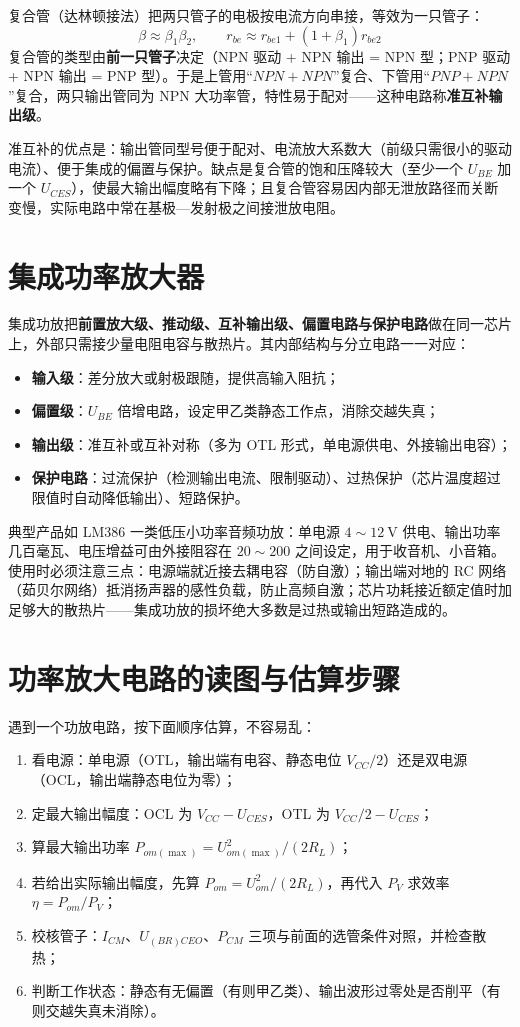 复合管（达林顿接法）把两只管子的电极按电流方向串接，等效为一只管子：
\begin{equation}
\beta\approx\beta_1\beta_2,\qquad
r_{be}\approx r_{be1}+(1+\beta_1)r_{be2}
\end{equation}
复合管的类型由\textbf{前一只管子}决定（NPN 驱动 + NPN 输出 = NPN 型；PNP 驱动 + NPN 输出 = PNP 型）。于是上管用“$NPN+NPN$”复合、下管用“$PNP+NPN$”复合，两只输出管同为 NPN 大功率管，特性易于配对——这种电路称\textbf{准互补输出级}。

准互补的优点是：输出管同型号便于配对、电流放大系数大（前级只需很小的驱动电流）、便于集成的偏置与保护。缺点是复合管的饱和压降较大（至少一个 $U_{BE}$ 加一个 $U_{CES}$），使最大输出幅度略有下降；且复合管容易因内部无泄放路径而关断变慢，实际电路中常在基极—发射极之间接泄放电阻。

\section{集成功率放大器}
集成功放把\textbf{前置放大级、推动级、互补输出级、偏置电路与保护电路}做在同一芯片上，外部只需接少量电阻电容与散热片。其内部结构与分立电路一一对应：
\begin{itemize}
    \item \textbf{输入级}：差分放大或射极跟随，提供高输入阻抗；
    \item \textbf{偏置级}：$U_{BE}$ 倍增电路，设定甲乙类静态工作点，消除交越失真；
    \item \textbf{输出级}：准互补或互补对称（多为 OTL 形式，单电源供电、外接输出电容）；
    \item \textbf{保护电路}：过流保护（检测输出电流、限制驱动）、过热保护（芯片温度超过限值时自动降低输出）、短路保护。
\end{itemize}
典型产品如 LM386 一类低压小功率音频功放：单电源 $4\sim12\ \mathrm{V}$ 供电、输出功率几百毫瓦、电压增益可由外接阻容在 $20\sim200$ 之间设定，用于收音机、小音箱。使用时必须注意三点：电源端就近接去耦电容（防自激）；输出端对地的 RC 网络（茹贝尔网络）抵消扬声器的感性负载，防止高频自激；芯片功耗接近额定值时加足够大的散热片——集成功放的损坏绝大多数是过热或输出短路造成的。

\section{功率放大电路的读图与估算步骤}
遇到一个功放电路，按下面顺序估算，不容易乱：
\begin{enumerate}
    \item 看电源：单电源（OTL，输出端有电容、静态电位 $V_{CC}/2$）还是双电源（OCL，输出端静态电位为零）；
    \item 定最大输出幅度：OCL 为 $V_{CC}-U_{CES}$，OTL 为 $V_{CC}/2-U_{CES}$；
    \item 算最大输出功率 $P_{om(\max)}=U_{om(\max)}^2/(2R_L)$；
    \item 若给出实际输出幅度，先算 $P_{om}=U_{om}^2/(2R_L)$，再代入 $P_V$ 求效率 $\eta=P_{om}/P_V$；
    \item 校核管子：$I_{CM}$、$U_{(BR)CEO}$、$P_{CM}$ 三项与前面的选管条件对照，并检查散热；
    \item 判断工作状态：静态有无偏置（有则甲乙类）、输出波形过零处是否削平（有则交越失真未消除）。
\end{enumerate}

